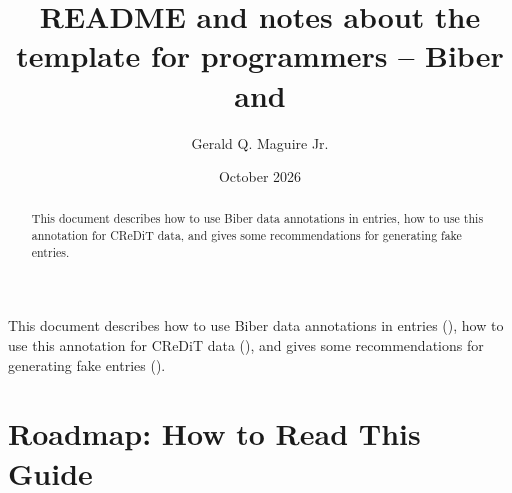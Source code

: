 \documentclass[12pt, twoside]{article}
\title{README and notes about the template for programmers -- Biber and \BibLaTeX{}}
\author{Gerald Q. Maguire Jr.}
\date{October 2026}
\renewcommand{\sectionmark}[1]{%
\markboth{#1}{}}
\begin{document}
\glsresetall
\maketitle
{}

\begin{abstract}
This document describes how to use Biber data annotations in \BibLaTeX{} entries, how to use this annotation for \gls{CReDiT} data, and gives some recommendations for generating fake \BibLaTeX{} entries.

\end{abstract}
\cleardoublepage


\renewcommand{\sectionmark}[1]{ \markboth{#1}{}}
\tableofcontents
\markboth{\contentsname}{}
\cleardoublepage
 
\setcounter{page}{1}
\glsresetall
This document describes how to use Biber data annotations in \BibLaTeX{} entries (), how to use this annotation for \gls{CReDiT} data (), and gives some recommendations for generating fake \BibLaTeX{} entries ().

\section{Roadmap: How to Read This Guide}
\end{document}
